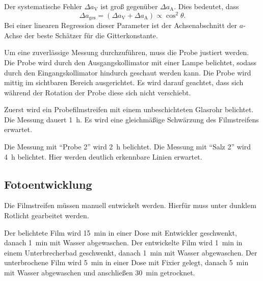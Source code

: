 Der systematische Fehler $\Delta a_\text{V}$ ist groß gegenüber $\Delta a_\text{A}$.
Dies bedeutet, dass
\begin{equation}
  \Delta a_\text{ges} = \left(\Delta a_\text{V} + \Delta a_\text{A}\right) \propto \cos^2\!{\theta}.
\end{equation}
Bei einer linearen Regression dieser Parameter ist
der Achsenabschnitt der $a$-Achse der beste Schätzer für die Gitterkonstante.


Um eine zuverlässige Messung durchzuführen, muss die Probe justiert werden.
Die Probe wird durch den Ausgangskollimator mit einer Lampe belichtet,
sodass durch den Eingangskollimator hindurch geschaut werden kann.
Die Probe wird mittig im sichtbaren Bereich ausgerichtet.
Es wird darauf geachtet, dass sich während der Rotation der Probe diese sich nicht verschiebt.

Zuerst wird ein Probefilmstreifen mit einem unbeschichteten Glasrohr belichtet.
Die Messung dauert \SI{1}{\hour}.
Es wird eine gleichmäßige Schwärzung des Filmstreifens erwartet.

Die Messung mit \enquote{Probe 2} wird \SI{2}{\hour} belichtet.
Die Messung mit \enquote{Salz 2} wird \SI{4}{\hour} belichtet.
Hier werden deutlich erkennbare Linien erwartet.

\subsection{Fotoentwicklung}%
\label{sub:fotoentwicklung}
Die Filmstreifen müssen manuell entwickelt werden.
Hierfür muss unter dunklem Rotlicht gearbeitet werden.

Der belichtete Film wird \SI{15}{\minute} in einer Dose mit Entwickler geschwenkt,
danach \SI{1}{\minute} mit Wasser abgewaschen.
Der entwickelte Film wird \SI{1}{\minute} in einem Unterbrecherbad geschwenkt,
danach \SI{1}{\minute} mit Wasser abgewaschen.
Der unterbrochene Film wird \SI{5}{\minute} in einer Dose mit Fixier gelegt,
danach \SI{5}{\minute} mit Wasser abgewaschen und anschließen \SI{30}{\minute} getrocknet.
